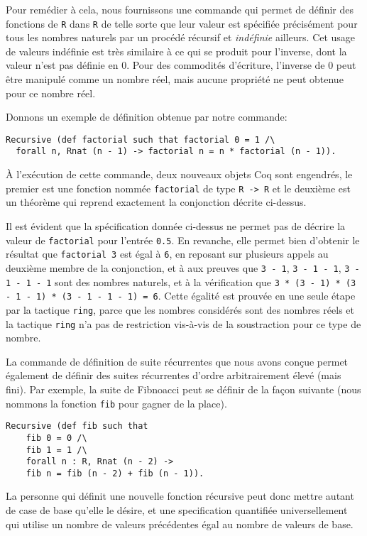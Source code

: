 \documentclass[draft]{jflart}
\begin{document}
Pour remédier à cela, nous fournissons une commande qui permet de
définir des fonctions de \texttt{R} dans \texttt{R} de telle sorte que leur
valeur est spécifiée précisément pour tous les nombres naturels par un
procédé récursif et {\em indéfinie} ailleurs.  Cet usage de valeurs
indéfinie est très similaire à ce qui se produit pour l'inverse, dont
la valeur n'est pas définie en 0.  Pour des commodités d'écriture,
l'inverse de 0 peut être manipulé comme un nombre réel, mais aucune
propriété ne peut obtenue pour ce nombre réel.

Donnons un exemple de définition obtenue par notre commande:
\begin{verbatim}
Recursive (def factorial such that factorial 0 = 1 /\
  forall n, Rnat (n - 1) -> factorial n = n * factorial (n - 1)).
\end{verbatim}
À l'exécution de cette commande, deux nouveaux objets Coq sont
engendrés, le premier est une fonction nommée \texttt{factorial} de
type \texttt{R -> R} et le
deuxième est un théorème qui reprend exactement la conjonction décrite
ci-dessus.

Il est évident que la spécification donnée ci-dessus ne permet pas de
décrire la valeur de \texttt{factorial} pour l'entrée \texttt{0.5}.
En revanche, elle permet bien d'obtenir le résultat que
\texttt{factorial 3} est égal à \texttt{6}, en reposant sur plusieurs
appels au deuxième membre de la conjonction, et à aux preuves que
\texttt{3 - 1}, \texttt{3 - 1 - 1}, \texttt{3 - 1 - 1 - 1} sont des
nombres naturels, et à la vérification que \texttt{3 * (3 - 1) * (3 -
  1 - 1) * (3 - 1 - 1 - 1) = 6}.  Cette égalité est prouvée en une
seule étape par la tactique \texttt{ring}, parce que les nombres
considérés sont des nombres réels et la tactique \texttt{ring} n'a pas de
restriction vis-à-vis de la soustraction pour ce type de nombre.

La commande de définition de suite récurrentes que nous avons conçue permet
également de définir des suites récurrentes d'ordre arbitrairement élevé
(mais fini).  Par exemple,  la suite de Fibnoacci peut se définir de la façon
suivante (nous nommons la fonction \texttt{fib} pour gagner de la place).

\begin{verbatim}
Recursive (def fib such that 
    fib 0 = 0 /\ 
    fib 1 = 1 /\
    forall n : R, Rnat (n - 2) -> 
    fib n = fib (n - 2) + fib (n - 1)).
\end{verbatim}
La personne qui définit une nouvelle fonction récursive peut donc
mettre autant de case de base qu'elle le désire, et une specification
quantifiée universellement qui utilise un nombre de valeurs
précédentes égal au nombre de valeurs de base.
\end{document}
